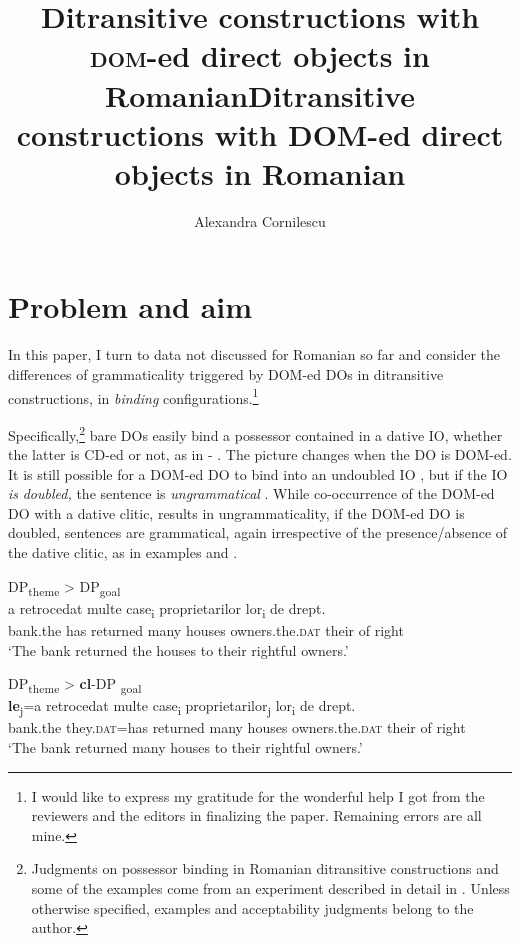 \documentclass[output=paper,colorlinks,citecolor=brown,nonflat]{./langscibook}
\author{Alexandra Cornilescu\affiliation{University of Bucharest}}
\title{Ditransitive constructions with \textsc{dom}-ed direct objects in Romanian}
\title{Ditransitive constructions with DOM-ed direct objects in Romanian}
\begin{document}
\maketitle 


\section{Problem and aim} %

In this paper, I turn to data not discussed for Romanian so far and consider the differences of grammaticality triggered by DOM-ed DOs in ditransitive constructions, in \textit{binding} configurations.\footnote{I would like to express my gratitude for the wonderful help I got from the reviewers and the editors in finalizing the paper. Remaining errors are all mine.}

Specifically,\footnote{Judgments on possessor binding in Romanian ditransitive constructions and some of the examples come from an experiment described in detail in \citep{CornilescuDinuTigău2017Dative}. Unless otherwise specified, examples and acceptability judgments belong to the author.} bare DOs easily bind a possessor contained in a dative IO, whether the latter is CD-ed or not, as in  - . The picture changes when the DO is DOM-ed. It is still possible for a DOM-ed DO to bind into an undoubled IO , but if the IO \textit{is} \textit{doubled,} the sentence is \textit{ungrammatical} . While co-occurrence of the DOM-ed DO with a dative clitic, results in ungrammaticality, if the DOM-ed \textsc{DO} is doubled, sentences are grammatical, again irrespective of the presence/absence of the dative clitic, as in examples  and .

	\ea \label{ex:cornilescu:1} DP\textsubscript{theme} > DP\textsubscript{goal}\\ %
		  {a} {retrocedat}  {multe} {case\textsubscript{i}}  {proprietarilor}   {lor\textsubscript{i}}  {de} {drept}.\\
	bank.the has returned  many houses  owners.the.\textsc{dat} their of right\\
		\glt ‘The bank returned the houses to their rightful owners.’ \citep[162]{CornilescuDinuTigău2017DOC}
	\z


\ea %
    \label{ex:cornilescu:2}
    DP\textsubscript{theme} > \textbf{cl}-DP \textsubscript{goal}\\
     \textbf{{le}}{\textsubscript{j}}{=a} {retrocedat} {multe} {case\textsubscript{i}} {proprietarilor\textsubscript{j}} {lor\textsubscript{i}} {de} {drept}.\\
        bank.the they.\textsc{dat}=has returned many houses owners.the.\textsc{dat} their of right\\
    \glt ‘The bank returned many houses to their rightful owners.’ \citep[162]{CornilescuDinuTigău2017DOC}
    \z
\end{document}
